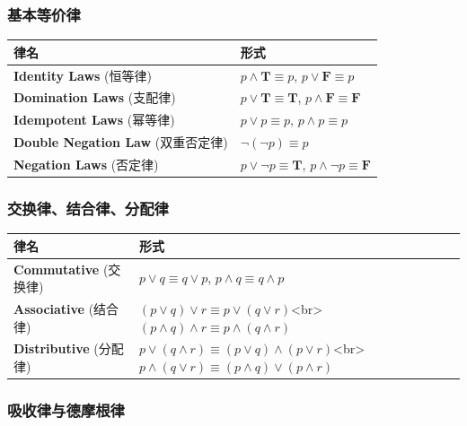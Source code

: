 \documentclass[10pt,a4paper,openany]{ctexbook}
\theoremstyle{definition}
\theoremstyle{remark}
\begin{document}
\subsubsection{基本等价律}

\begin{center}
\begin{tabular}{ll}
\hline
律名 & 形式 \\ \hline
\textbf{Identity Laws} (恒等律) & $p \land \mathbf{T} \equiv p$, $p \lor \mathbf{F} \equiv p$ \\
\textbf{Domination Laws} (支配律) & $p \lor \mathbf{T} \equiv \mathbf{T}$, $p \land \mathbf{F} \equiv \mathbf{F}$ \\
\textbf{Idempotent Laws} (幂等律) & $p \lor p \equiv p$, $p \land p \equiv p$ \\
\textbf{Double Negation Law} (双重否定律) & $\neg(\neg p) \equiv p$ \\
\textbf{Negation Laws} (否定律) & $p \lor \neg p \equiv \mathbf{T}$, $p \land \neg p \equiv \mathbf{F}$ \\
\hline
\end{tabular}

\end{center}

\subsubsection{交换律、结合律、分配律}

\begin{center}
\begin{tabular}{ll}
\hline
律名 & 形式 \\ \hline
\textbf{Commutative} (交换律) & $p \lor q \equiv q \lor p$, $p \land q \equiv q \land p$ \\
\textbf{Associative} (结合律) & $(p \lor q) \lor r \equiv p \lor (q \lor r)$<br>$(p \land q) \land r \equiv p \land (q \land r)$ \\
\textbf{Distributive} (分配律) & $p \lor (q \land r) \equiv (p \lor q) \land (p \lor r)$<br>$p \land (q \lor r) \equiv (p \land q) \lor (p \land r)$ \\
\hline
\end{tabular}

\end{center}

\subsubsection{吸收律与德摩根律}
\end{document}
